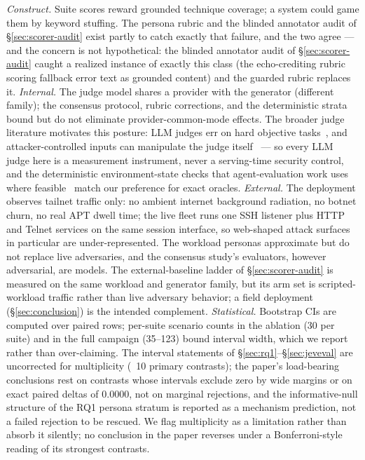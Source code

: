 \emph{Construct.} Suite scores reward grounded technique coverage; a
system could game them by keyword stuffing. The persona rubric and the
blinded annotator audit of \S\ref{sec:scorer-audit} exist partly to
catch exactly that failure, and the two agree --- and the concern is not hypothetical: the blinded annotator audit
of \S\ref{sec:scorer-audit} caught a realized instance of exactly this
class (the echo-crediting rubric scoring fallback error text as grounded
content) and the guarded rubric replaces it. \emph{Internal.} The judge model shares a provider with
the generator (different family); the consensus protocol, rubric
corrections, and the deterministic strata bound but do not eliminate
provider-common-mode effects. The broader judge literature motivates
this posture: LLM judges err on hard objective tasks~\cite{tan2025judgebench},
and attacker-controlled inputs can manipulate the judge
itself~\cite{shi2024judgedeceiver} --- so every LLM judge here is a
measurement instrument, never a serving-time security control, and the
deterministic environment-state checks that agent-evaluation work uses
where feasible~\cite{debenedetti2024agentdojo} match our preference for
exact oracles. \emph{External.} The deployment observes tailnet traffic only: no ambient internet background
radiation, no botnet churn, no real APT dwell time; the live fleet runs
one SSH listener plus HTTP and Telnet services on the same session
interface, so web-shaped attack surfaces in particular are
under-represented. The workload personas approximate
but do not replace live adversaries, and the consensus study's
evaluators, however adversarial, are models. The external-baseline
ladder of \S\ref{sec:scorer-audit} is measured on the same workload and
generator family, but its arm set is scripted-workload traffic rather
than live adversary behavior; a field deployment (\S\ref{sec:conclusion})
is the intended complement. \emph{Statistical.}
Bootstrap CIs are computed over paired rows; per-suite scenario counts
in the ablation (30 per suite) and in the full campaign (35--123) bound
interval width, which we report rather than
over-claiming. The interval statements of \S\ref{sec:rq1}--\S\ref{sec:jeveval}
are uncorrected for multiplicity (~10 primary contrasts); the paper's
load-bearing conclusions rest on contrasts whose intervals exclude zero
by wide margins or on exact paired deltas of $0.0000$, not on
marginal rejections, and the informative-null structure of the RQ1
persona stratum is reported as a mechanism prediction, not a failed
rejection to be rescued. We flag multiplicity as a limitation rather
than absorb it silently; no conclusion in the paper reverses under a
Bonferroni-style reading of its strongest contrasts.
\fi
